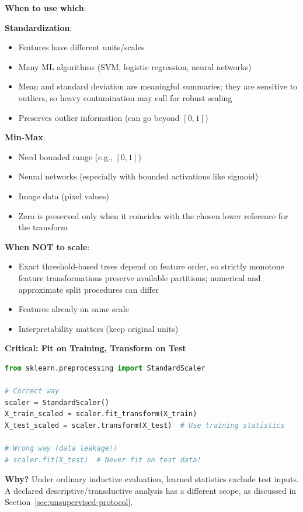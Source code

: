 \documentclass[11pt,twoside]{article}
\numberwithin{equation}{section}
\theoremstyle{plain}
\theoremstyle{definition}
\theoremstyle{remark}
\newenvironment{keyidea}{
  \begin{tcolorbox}[colback=yellow!5!white,
                    colframe=yellow!50!black,
                    title=Key Idea,
                    breakable,
                    enhanced,
                    sharp corners,
                    boxrule=0.8pt,
                    left=6pt, right=6pt, top=6pt, bottom=6pt]
}{
  \end{tcolorbox}
}
\begin{document}
\begin{keyidea}
\textbf{When to use which}:

\textbf{Standardization}:
\begin{itemize}
\item Features have different units/scales
\item Many ML algorithms (SVM, logistic regression, neural networks)
\item Mean and standard deviation are meaningful summaries; they are sensitive to outliers, so heavy contamination may call for robust scaling
\item Preserves outlier information (can go beyond $[0,1]$)
\end{itemize}

\textbf{Min-Max}:
\begin{itemize}
\item Need bounded range (e.g., $[0,1]$)
\item Neural networks (especially with bounded activations like sigmoid)
\item Image data (pixel values)
\item Zero is preserved only when it coincides with the chosen lower reference for the transform
\end{itemize}

\textbf{When NOT to scale}:
\begin{itemize}
\item Exact threshold-based trees depend on feature order, so strictly monotone feature transformations preserve available partitions; numerical and approximate split procedures can differ
\item Features already on same scale
\item Interpretability matters (keep original units)
\end{itemize}
\end{keyidea}

\begin{implementationbox}
\textbf{Critical: Fit on Training, Transform on Test}

\begin{lstlisting}[language=Python]
from sklearn.preprocessing import StandardScaler

# Correct way
scaler = StandardScaler()
X_train_scaled = scaler.fit_transform(X_train)
X_test_scaled = scaler.transform(X_test)  # Use training statistics

# Wrong way (data leakage!)
# scaler.fit(X_test)  # Never fit on test data!
\end{lstlisting}

\textbf{Why?} Under ordinary inductive evaluation, learned statistics exclude test inputs. A declared descriptive/transductive analysis has a different scope, as discussed in Section~\ref{sec:unsupervised-protocol}.
\end{implementationbox}
\end{document}
